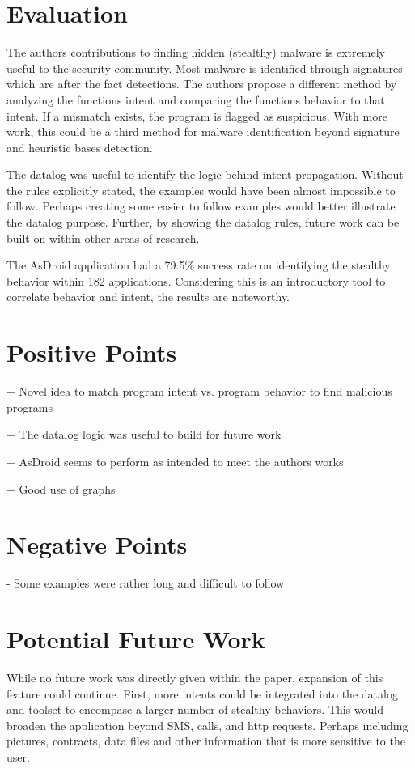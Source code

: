 \documentclass[conference]{IEEEtran}
\begin{document}
\section{Evaluation}
The authors contributions to finding hidden (stealthy) malware is extremely useful to the security community. Most malware is identified through signatures which are after the fact detections. The authors propose a different method by analyzing the functions intent and comparing the functions behavior to that intent. If a mismatch exists, the program is flagged as suspicious. With more work, this could be a third method for malware identification beyond signature and heuristic bases detection. 

The datalog was useful to identify the logic behind intent propagation. Without the rules explicitly stated, the examples would have been almost impossible to follow. Perhaps creating some easier to follow examples would better illustrate the datalog purpose. Further, by showing the datalog rules, future work can be built on within other areas of research. 

The AsDroid application had a 79.5\% success rate on identifying the stealthy behavior within 182 applications. Considering this is an introductory tool to correlate behavior and intent, the results are noteworthy. 

\section{Positive Points}
+ Novel idea to match program intent vs. program behavior to find malicious programs

+ The datalog logic was useful to build for future work

+ AsDroid seems to perform as intended to meet the authors works

+ Good use of graphs

\section{Negative Points}
- Some examples were rather long and difficult to follow

\section{Potential Future Work}
While no future work was directly given within the paper, expansion of this feature could continue. First, more intents could be integrated into the datalog and toolset to encompase a larger number of stealthy behaviors. This would broaden the application beyond SMS, calls, and http requests. Perhaps including pictures, contracts, data files and other information that is more sensitive to the user. 
\end{document}

